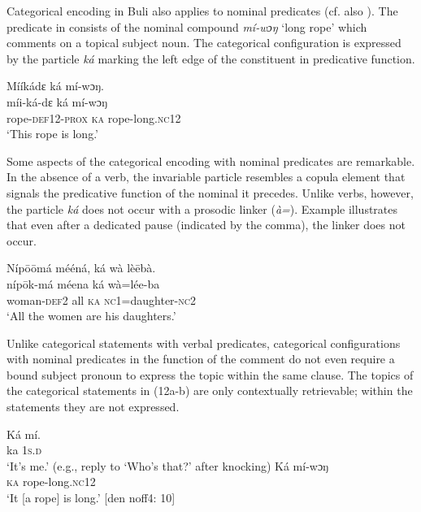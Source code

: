 \documentclass[output=paper]{langsci/langscibook}
\begin{document}
Categorical encoding in Buli also applies to nominal predicates (cf. also \citealt{Schwarz2009}). The predicate in  consists of the nominal compound \textit{mí-wɔŋ} ‘long rope’ which comments on a topical subject noun. The categorical configuration is expressed by the particle \textit{ká} marking the left edge of the constituent in predicative function. 

\ea\label{ex:schwarz:10}
\glll  Mííkádɛ    ká  mí-wɔŋ.\\
  míi-ká-dɛ    ká  mí-wɔŋ\\
       rope-\textsc{def}12-\textsc{prox}  \textsc{ka}  rope-long.\textsc{nc}12\\
\glt ‘This rope is long.’ \citep[267]{Schwarz2009}
\z

Some aspects of the categorical encoding with nominal predicates are remarkable. In the absence of a verb, the invariable particle resembles a copula element that signals the predicative function of the nominal it precedes. Unlike verbs, however, the particle \textit{ká} does not occur with a prosodic linker (\textit{à=}). Example  illustrates that even after a dedicated pause (indicated by the comma), the linker does not occur.

\ea\label{ex:schwarz:11}
\glll   \textup{Níp}\={o}\={o}má  mééná,    ká  {wà  lè\={e}bà.}\\
    níp\={o}k-má  méena    ká  wà=lée-ba\\
   woman-\textsc{def}2  all    \textsc{ka}  \textsc{nc}1=daughter-\textsc{nc}2\\
\glt ‘All the women are his daughters.’ \citep[268]{Schwarz2009}
\z

Unlike categorical statements with verbal predicates, categorical configurations with nominal predicates in the function of the comment do not even require a bound subject pronoun to express the topic within the same clause. The topics of the categorical statements in (12a-b) are only contextually retrievable; within the statements they are not expressed.     


\begin{exe}
	\ex\label{ex:schwarz:12a}\begin{xlist}
		\ex  \gll Ká  mí. \\
			ka  1\textsc{s.d}\\
\glt   ‘It’s me.’ (e.g., reply to ‘Who’s that?’ after knocking) \citep[269]{Schwarz2009}
		\ex\gll  Ká  mí-wɔŋ\\
			\textsc{ka}  rope-long.\textsc{nc}12\\
    \glt ‘It [a rope] is long.’ [den noff4: 10]
	\end{xlist}
\end{exe}
\end{document}
